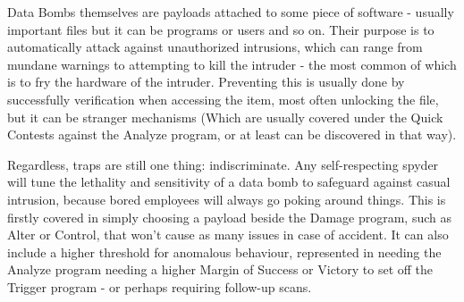 \begin{multicols}{2}
	Data Bombs themselves are payloads attached to some piece of software - usually important files but it can be programs or users and so on. Their purpose is to automatically attack against unauthorized intrusions, which can range from mundane warnings to attempting to kill the intruder - the most common of which is to fry the hardware of the intruder. Preventing this is usually done by successfully verification when accessing the item, most often unlocking the file, but it can be stranger mechanisms (Which are usually covered under the Quick Contests against the Analyze program, or at least can be discovered in that way).
	
	Regardless, traps are still one thing: indiscriminate. Any self-respecting spyder will tune the lethality and sensitivity of a data bomb to safeguard against casual intrusion, because bored employees will always go poking around things. This is firstly covered in simply choosing a payload beside the Damage program, such as Alter or Control, that won't cause as many issues in case of accident. It can also include a higher threshold for anomalous behaviour, represented in needing the Analyze program needing a higher Margin of Success or Victory to set off the Trigger program - or perhaps requiring follow-up scans.
	

\end{multicols}
